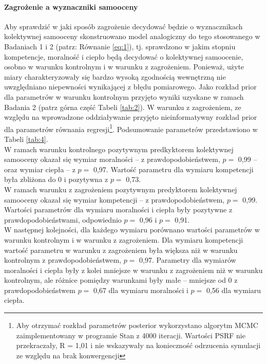 \documentclass[man]{apa6}
\begin{document}
\paragraph{Zagrożenie a wyznaczniki samooceny}
Aby sprawdzić w jaki sposób zagrożenie decydować będzie o wyznacznikach kolektywnej samooceny skonstruowano model analogiczny do tego stosowanego w Badaniach 1 i 2 (patrz: Równanie \ref{eq:1}), tj. sprawdzono w jakim stopniu kompetencje, moralność i ciepło będą decydować o kolektywnej samoocenie, osobno w warunku kontrolnym i w warunku z zagrożeniem. Ponieważ, użyte miary charakteryzowały się bardzo wysoką zgodnością wewnętrzną nie uwzględniano niepewności wynikającej z błędu pomiarowego. Jako rozkład prior dla parametrów w warunku kontrolnym przyjęto wyniki uzyskane w ramach Badania 2 (patrz górna część Tabeli \ref{tab:2}). W warunku z zagrożeniem, ze względu na wprowadzone oddziaływanie przyjęto nieinformatywny rozkład prior dla parametrów równania regresji\footnote{Aby otrzymać rozkład parametrów posterior wykorzystano algorytm MCMC zaimplementowany w programie Stan z 4000 iteracji. Wartości PSRF nie przekraczały, R = 1,01 i nie wskazywały na konieczność odrzucenia symulacji ze względu na brak konwergencji}. Podsumowanie parametrów przedstawiono w Tabeli \ref{tab:4}. \\

W ramach warunku kontrolnego pozytywnym predkyktorem kolektywnej samooceny okazał się wymiar moralności -- z prawdopodobieństwem, $p =$ 0,99 -- oraz wymiar ciepła -- z $p =$ 0,97. Wartość parametru dla wymiaru kompetencji była zbliżona do 0 i pozytywna z $p =$ 0,73. \\

W ramach warunku z zagrożeniem pozytywnym predyktorem kolektywnej samooceny okazał się wymiar kompetencji -- z prawdopodobieństwem, $p =$ 0,99. Wartości parametrów dla wymiaru moralności i ciepła były pozytywne z prawdopodobieństwami, odpowiednio $p =$ 0,96 i $p =$ 0,91.\\

W następnej kolejności, dla każdego wymiaru porównano wartości parametrów w warunku kontrolnym i w warunku z zagrożeniem. Dla wymiaru kompetencji wartość parametru w warunku z zagrożeniem była większa niż w warunku kontrolnym z prawdopodobieństwem, $p =$ 0,97. Parametry dla wymiarów moralności i ciepła były z kolei mniejsze w warunku z zagrożeniem niż w warunku kontrolnym, ale różnice pomiędzy warunkami były małe -- mniejsze od 0 z prawdopodobieństwem $p = $ 0,67 dla wymiaru moralności i $p =$ 0,56 dla wymiaru ciepła.\\
\end{document}
